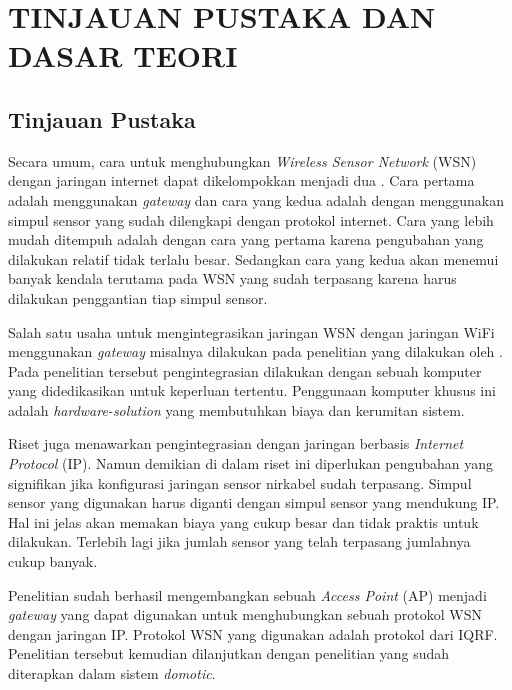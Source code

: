 
\chapter{TINJAUAN PUSTAKA DAN DASAR TEORI}                

\section{Tinjauan Pustaka}
  Secara umum, cara untuk menghubungkan \emph{Wireless Sensor Network} (WSN) dengan jaringan internet dapat dikelompokkan menjadi dua \cite{Rodrigues2010}. Cara pertama adalah menggunakan \emph{gateway} dan cara yang kedua adalah dengan menggunakan simpul sensor yang sudah dilengkapi dengan protokol internet. Cara yang lebih mudah ditempuh adalah dengan cara yang pertama karena pengubahan yang dilakukan relatif tidak terlalu besar. Sedangkan cara yang kedua akan menemui banyak kendala terutama pada WSN yang sudah terpasang karena harus dilakukan penggantian tiap simpul sensor.

  Salah satu usaha untuk mengintegrasikan jaringan WSN dengan jaringan WiFi menggunakan \emph{gateway} misalnya dilakukan pada penelitian yang dilakukan oleh \cite{Spinar2009}. Pada penelitian tersebut pengintegrasian dilakukan dengan sebuah komputer yang didedikasikan untuk keperluan tertentu. Penggunaan komputer khusus ini adalah \emph{hardware-solution} yang membutuhkan biaya dan kerumitan sistem.

  Riset \cite{Dunkels2004} juga menawarkan pengintegrasian dengan jaringan berbasis \emph{Internet Protocol} (IP). Namun demikian di dalam riset ini diperlukan pengubahan yang signifikan jika konfigurasi jaringan sensor nirkabel sudah terpasang. Simpul sensor yang digunakan harus diganti dengan simpul sensor yang mendukung IP. Hal ini jelas akan memakan biaya yang cukup besar dan tidak praktis untuk dilakukan. Terlebih lagi jika jumlah sensor yang telah terpasang jumlahnya cukup banyak.

  Penelitian \cite{wibowo2013wireless} sudah berhasil mengembangkan sebuah \emph{Access Point} (AP) menjadi \emph{gateway} yang dapat digunakan untuk menghubungkan sebuah protokol WSN dengan jaringan IP. Protokol WSN yang digunakan adalah protokol dari IQRF. Penelitian tersebut kemudian dilanjutkan dengan penelitian \cite{widyawan2012ihome} yang sudah diterapkan dalam sistem \emph{domotic}.

